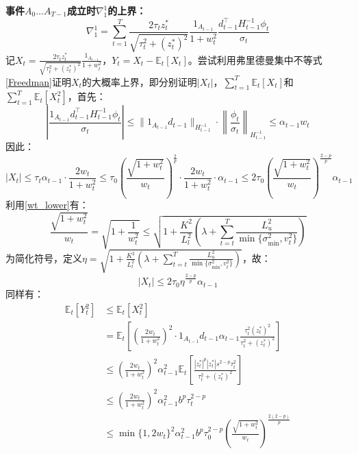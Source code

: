 \documentclass[UTF8,a4paper,10.5pt]{ctexart}
\newcommand{\E}{\mathbb{E}}
\begin{document}
\textbf{事件$A_0 \ldots A_{T-1}$成立时$\nabla^1_1$的上界：}
\begin{equation*}
	\nabla^1_1 = \sum_{t=1}^T \frac{2\tau_t z^*_t}{\sqrt{\tau_t^2+(z^*_t)^2}}\frac{1_{A_{t-1}}}{1+w_t^2}\frac{d_{t-1}^\top H_{t-1}^{-1}\phi_t}{\sigma_t}
\end{equation*}
记$X_t = \frac{2\tau_t z^*_t}{\sqrt{\tau_t^2+(z^*_t)^2}}\frac{1_{A_{t-1}}}{1+w_t^2}$，$Y_t = X_t - \E_t[X_t]$。尝试利用弗里德曼集中不等式\ref{Freedman}证明$X_t$的大概率上界，即分别证明$|X_t|$，$\sum_{t=1}^{T}\E_t[X_t]$和$\sum_{t=1}^{T}\E_t[X_t^2]$，首先：
\begin{equation*}
	\left| \frac{1_{A_{t-1}} d_{t-1}^\top H_{t-1}^{-1}\phi_t}{\sigma_t} \right| \leq \|1_{A_{t-1}} d_{t-1}\|_{H_{t-1}^{-1}} \cdot \left\lVert \frac{\phi_t}{\sigma_t}\right\rVert_{H_{t-1}^{-1}} \leq \alpha_{t-1}w_t
\end{equation*}
因此：
\begin{equation*}
	|X_t| \leq \tau_t\alpha_{t-1}\cdot \frac{2w_t}{1+w_t^2} \leq \tau_0 \left(\frac{\sqrt{1+w_t^2}}{w_t}\right)^{\frac{2}{p}}\cdot \frac{2w_t}{1+w_t^2} \cdot \alpha_{t-1} \leq 2\tau_0 \left(\frac{\sqrt{1+w_t^2}}{w_t}\right)^{\frac{2-p}{p}}\alpha_{t-1}
\end{equation*}
利用\ref{wt_lower}有：
\begin{equation}
	\frac{\sqrt{1+w_t^2}}{w_t} = \sqrt{1+ \frac{1}{w_t^2}} \leq \sqrt{1+\frac{K^2}{L_l^2}(\lambda +  \sum_{t=t}^T\frac{L_u^2}{\min\{\sigma_{\min}^2,v_t^2\}})}
\end{equation}
为简化符号，定义$\eta= \sqrt{1+\frac{K^2}{L_l^2}(\lambda +  \sum_{t=t}^T\frac{L_u^2}{\min\{\sigma_{\min}^2,v_t^2\}})}$，故：
\begin{equation*}
	|X_t|\leq 2\tau_0 \eta^{\frac{2-p}{p}}\alpha_{t-1}
\end{equation*}
同样有：
\begin{align*}
	\E_t[Y_t^2] &\leq \E_t[X_t^2]\\ 
	&= \E_t\left[\left(\frac{2w_t}{1+w_t^2}\right)^2 \cdot 1_{A_{t-1}} d_{t-1} \alpha_{t-1} \frac{\tau_t^2 (z^*_t)^2}{\tau_t^2+(z^*_t)^2}\right] \\
	&\leq \left(\frac{2w_t}{1+w_t^2}\right)^2\alpha^2_{t-1}\E_t \left[\frac{|z^*_t|^p |z^*_t|s^{2-p} \tau_t^2}{\tau_t^2+(z^*_t)^2}\right] \\
	&\leq \left(\frac{2w_t}{1+w_t^2}\right)^2\alpha^2_{t-1} b^p \tau_t^{2-p} \\
	& \leq \min\{1,2w_t\}^2 \alpha^2_{t-1} b^p \tau_0^{2-p} \left(\frac{\sqrt{1+w_t^2}}{w_t}\right)^{\frac{2(2-p)}{p}}
\end{align*}
\end{document}

